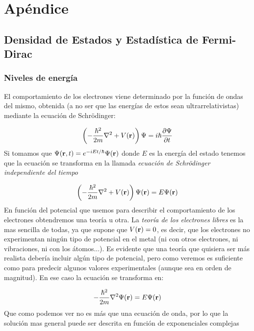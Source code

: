 \appendix 

\chapter{Apéndice}

\section{Densidad de Estados y Estadística de Fermi-Dirac} \label{Sec:A-01}

\subsection{Niveles de energía}

El comportamiento de los electrones viene determinado por la función de ondas del mismo, obtenida (a no ser que las energías de estos sean ultrarrelativistas)  mediante la ecuación de Schrödinger:

\begin{equation}
	\left( -\frac{\hbar^2}{2m} \nabla^2 + V(\mathbf{r}) \right) \Psi = i \hbar \frac{\partial \Psi}{\partial t}
\end{equation}
Si tomamos que $\Psi (\mathbf{r},t)=e^{-iEt/\hbar} \Psi (\mathbf{r})$ donde $E$ es la energía del estado tenemos que la ecuación se transforma en la llamada \textit{ecuación de Schrödinger independiente del tiempo}

\begin{equation}
	\left( -\frac{\hbar^2}{2m} \nabla^2 + V(\mathbf{r}) \right) \Psi (\mathbf{r}) = E \Psi (\mathbf{r})
\end{equation}
En función del potencial que usemos para describir el comportamiento de los electrones obtendremos una teoría u otra. La \textit{teoría de los electrones libres} es la mas sencilla de todas, ya que supone que $V(\mathbf{r}) = 0$, es decir, que los electrones no experimentan ningún tipo de potencial en el metal (ni con otros electrones, ni vibraciones, ni con los átomos...). Es evidente que una teoría que quisiera ser más realista debería incluir algún tipo de potencial, pero como veremos es suficiente como para predecir algunos valores experimentales (aunque sea en orden de magnitud). En ese caso la ecuación se transforma en:

\begin{equation}
	-\frac{\hbar^2}{2m} \nabla^2  \Psi (\mathbf{r}) = E \Psi (\mathbf{r}) \label{Ec:06-01-03}
\end{equation}
Que como podemos ver no es más que una ecuación de onda, por lo que la solución mas general puede ser descrita en función de exponenciales complejas

